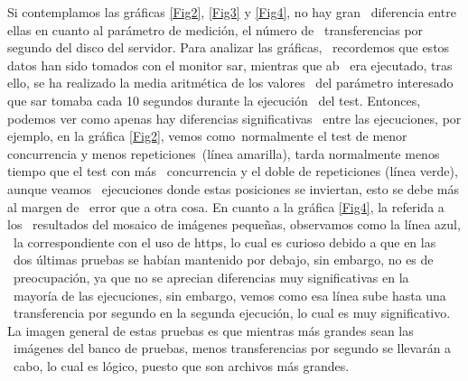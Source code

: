 \documentclass[11pt,twoside,a4paper]{book}
\begin{document}
Si contemplamos las gráficas \ref{Fig2}, \ref{Fig3} y \ref{Fig4}, no hay gran \
diferencia entre ellas en cuanto al parámetro de medición, el número de \
transferencias por segundo del disco del servidor. Para analizar las gráficas, \
recordemos que estos datos han sido tomados con el monitor sar, mientras que ab \
era ejecutado, tras ello, se ha realizado la media aritmética de los valores \
del parámetro interesado que sar tomaba cada 10 segundos durante la ejecución \
del test. Entonces, podemos ver como apenas hay diferencias significativas \
entre las ejecuciones, por ejemplo, en la gráfica \ref{Fig2}, vemos como\
normalmente el test de menor concurrencia y menos repeticiones\
(línea amarilla), tarda normalmente menos tiempo que el test con más \
concurrencia y el doble de repeticiones (línea verde), aunque veamos \
ejecuciones donde estas posiciones se inviertan, esto se debe más al margen de \
error que a otra cosa. En cuanto a la gráfica \ref{Fig4}, la referida a los \
resultados del mosaico de imágenes pequeñas, observamos como la línea azul, \
la correspondiente con el uso de https, lo cual es curioso debido a que en las \
dos últimas pruebas se habían mantenido por debajo, sin embargo, no es de \
preocupación, ya que no se aprecian diferencias muy significativas en la \
mayoría de las ejecuciones, sin embargo, vemos como esa línea sube hasta una \
transferencia por segundo en la segunda ejecución, lo cual es muy significativo.
La imagen general de estas pruebas es que mientras más grandes sean las \
imágenes del banco de pruebas, menos transferencias por segundo se llevarán a \
cabo, lo cual es lógico, puesto que son archivos más grandes. \newline
\end{document}
